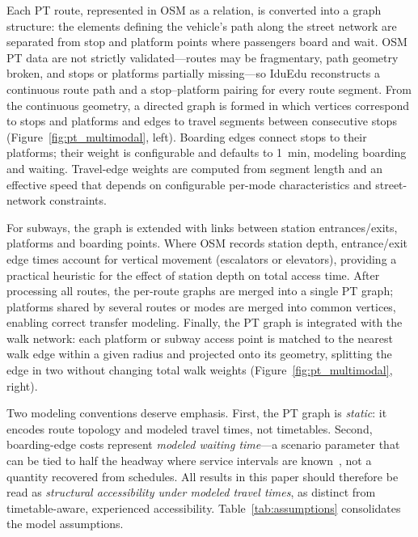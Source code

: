 \documentclass[smartcities,article,submit,moreauthors]{Definitions/mdpi}
\begin{document}
    Each PT route, represented in OSM as a relation, is converted into a graph structure: the elements
    defining the vehicle's path along the street network are separated from stop and platform points
    where passengers board and wait.
    OSM PT data are not strictly validated---routes may be fragmentary, path geometry broken, and stops
    or platforms partially missing---so IduEdu reconstructs a continuous route path and a
    stop--platform pairing for every route segment.
    From the continuous geometry, a directed graph is formed in which vertices correspond to stops and
    platforms and edges to travel segments between consecutive stops (Figure~\ref{fig:pt_multimodal},
    left).
    Boarding edges connect stops to their platforms; their weight is configurable and defaults to
    1~min, modeling boarding and waiting.
    Travel-edge weights are computed from segment length and an effective speed that depends on
    configurable per-mode characteristics and street-network constraints.

    For subways, the graph is extended with links between station entrances/exits, platforms and
    boarding points.
    Where OSM records station depth, entrance/exit edge times account for vertical movement (escalators
    or elevators), providing a practical heuristic for the effect of station depth on total access
    time.
    After processing all routes, the per-route graphs are merged into a single PT graph; platforms
    shared by several routes or modes are merged into common vertices, enabling correct transfer
    modeling.
    Finally, the PT graph is integrated with the walk network: each platform or subway access
    point is matched to the nearest walk edge within a given radius and projected onto its geometry,
    splitting the edge in two without changing total walk weights (Figure~\ref{fig:pt_multimodal},
    right).

    Two modeling conventions deserve emphasis.
    First, the PT graph is \emph{static}: it encodes route topology and modeled travel times, not
    timetables.
    Second, boarding-edge costs represent \emph{modeled waiting time}---a scenario parameter that can be
    tied to half the headway where service intervals are known~\cite{gogousou2026mobilityoracle}, not a
    quantity recovered from schedules.
    All results in this paper should therefore be read as \emph{structural accessibility under modeled
    travel times}, as distinct from timetable-aware, experienced accessibility.
    Table~\ref{tab:assumptions} consolidates the model assumptions.
\end{document}
